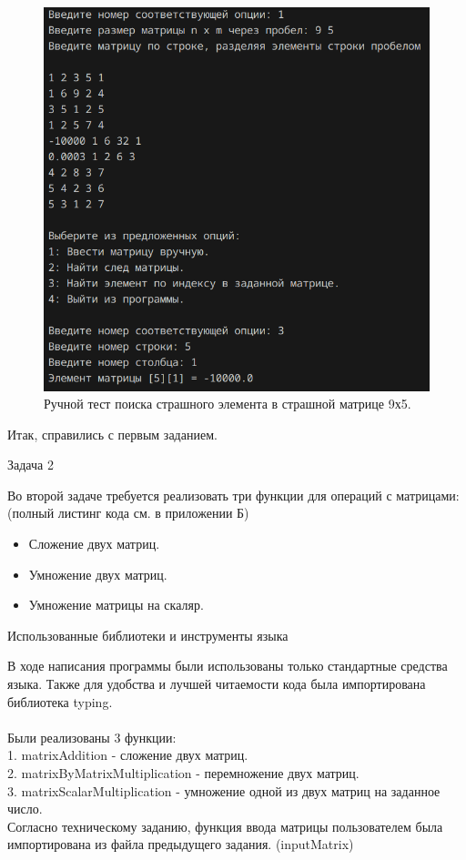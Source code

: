 \begin{figure}[H]
	\centering
	\includegraphics[width=0.5\linewidth]{tests-task3}
	\caption*{Ручной тест поиска страшного элемента в страшной матрице 9х5.}
	\label{fig:tests-task3}
\end{figure}
Итак, справились с первым заданием.\vspace{2cm}

\begin{large}
	Задача 2\\
\end{large}
Во второй задаче требуется реализовать три функции для операций с матрицами: (полный листинг кода см. в приложении Б)\\
\begin{itemize}
	\item Сложение двух матриц.
	\item Умножение двух матриц.
	\item Умножение матрицы на скаляр.\\
\end{itemize}

\begin{large}
	Использованные библиотеки и инструменты языка\\
\end{large}
В ходе написания программы были использованы только стандартные средства языка. Также для удобства и лучшей читаемости кода была импортирована библиотека typing.\\\\
Были реализованы 3 функции:\\
1. matrixAddition - сложение двух матриц.\\
2. matrixByMatrixMultiplication - перемножение двух матриц.\\
3. matrixScalarMultiplication - умножение одной из двух матриц на заданное число.\\
Согласно техническому заданию, функция ввода матрицы пользователем была импортирована из файла предыдущего задания. (inputMatrix)


